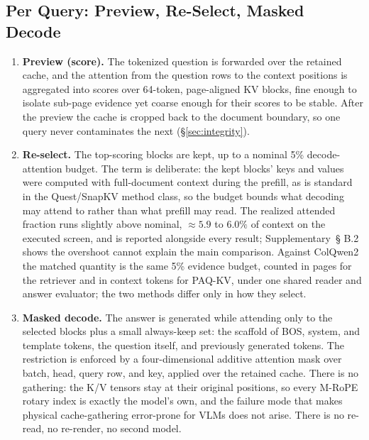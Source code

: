 \documentclass[letterpaper]{article} %
\newcommand{\paqc}{\textsc{PAQ-KV}}
\begin{document}
\subsection{Per Query: Preview, Re-Select, Masked Decode}
\begin{enumerate}
\item \textbf{Preview (score).} The tokenized question is forwarded over the
retained cache, and the attention from the question rows to the context
positions is aggregated into scores over 64-token, page-aligned KV blocks,
fine enough to isolate sub-page evidence yet coarse enough for their scores
to be stable. After the
preview the cache is cropped back to the document boundary, so one query never
contaminates the next (\S\ref{sec:integrity}).
\item \textbf{Re-select.} The top-scoring blocks are kept, up to a nominal 5\%
decode-attention budget. The term is deliberate: the kept blocks' keys and
values were computed with full-document context during the prefill, as is
standard in the Quest/SnapKV method class, so the budget bounds what decoding
may attend to rather than what prefill may read. The realized attended
fraction runs slightly above nominal, ${\approx}5.9$ to $6.0\%$ of context on
the executed screen, and is reported alongside every result; Supplementary~\S
B.2 shows the overshoot cannot explain the main comparison. Against ColQwen2
the matched quantity is the same 5\% evidence budget, counted in pages for the
retriever and in context tokens for \paqc{}, under one shared reader and
answer evaluator; the two methods differ only in how they select.
\item \textbf{Masked decode.} The answer is generated while attending only to
the selected blocks plus a small always-keep set: the scaffold of BOS, system,
and template tokens, the question itself, and previously generated tokens. The
restriction is enforced by a four-dimensional additive attention mask over
batch, head, query row, and key, applied over the retained cache. There is no
gathering: the K/V tensors stay at their original positions, so every M-RoPE
rotary index is exactly the model's own, and the failure mode that makes
physical cache-gathering error-prone for VLMs does not arise. There is no
re-read, no re-render, no second model.
\end{enumerate}
\end{document}
